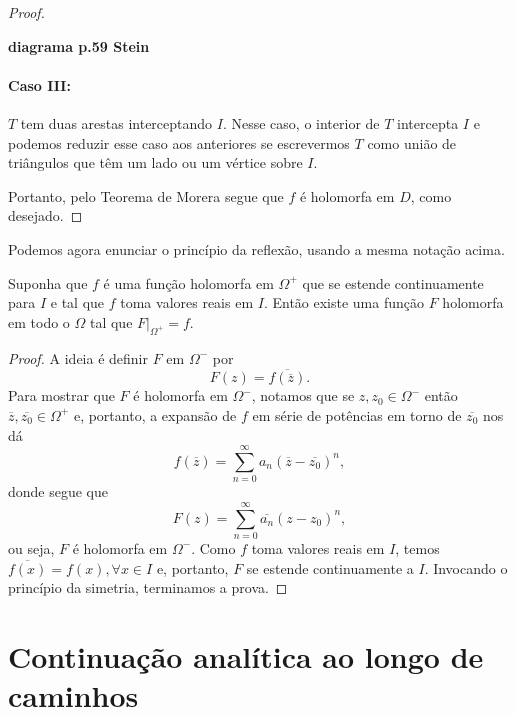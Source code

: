 \begin{proof}
\begin{center}
    \textbf{diagrama p.59 Stein}
\end{center}

\paragraph{Caso III:} $T$ tem duas arestas interceptando $I$. Nesse caso, o interior
de $T$ intercepta $I$ e podemos reduzir esse caso aos anteriores se escrevermos $T$
como união de triângulos que têm um lado ou um vértice sobre $I$.

Portanto, pelo Teorema de Morera segue que $f$ é holomorfa em $D$, como desejado.
\end{proof}

Podemos agora enunciar o princípio da reflexão, usando a mesma notação acima.

\begin{teorema}
\label{teo-reflexao-schwarz}
Suponha que $f$ é uma função holomorfa em $\Omega^+$ que se estende continuamente 
para $I$ e tal que $f$ toma valores reais em $I$. Então existe uma função $F$
holomorfa em todo o $\Omega$ tal que $F\big|_{\Omega^+} = f$.
\end{teorema}

\begin{proof}
A ideia é definir $F$ em $\Omega^-$ por
\begin{equation*}
    F(z) = \overline{f(\overline{z})}.
\end{equation*}
Para mostrar que $F$ é holomorfa em $\Omega^-$, notamos que se $z, z_0\in\Omega^-$
então $\overline{z}, \overline{z_0}\in\Omega^+$ e, portanto, a expansão de $f$
em série de potências em torno de $\overline{z_0}$ nos dá
\begin{equation*}
    f(\overline{z}) = \sum_{n=0}^{\infty} a_n(\overline{z} - \overline{z_0})^n,
\end{equation*}
donde segue que
\begin{equation*}
    F(z) = \sum_{n=0}^{\infty} \overline{a_n}(z - z_0)^n,
\end{equation*}
ou seja, $F$ é holomorfa em $\Omega^-$. Como $f$ toma valores reais em $I$, temos
$\overline{f(x)} = f(x), \forall x\in I$ e, portanto, $F$ se estende continuamente
a $I$. Invocando o princípio da simetria, terminamos a prova.
\end{proof}


\section{Continuação analítica ao longo de caminhos}

